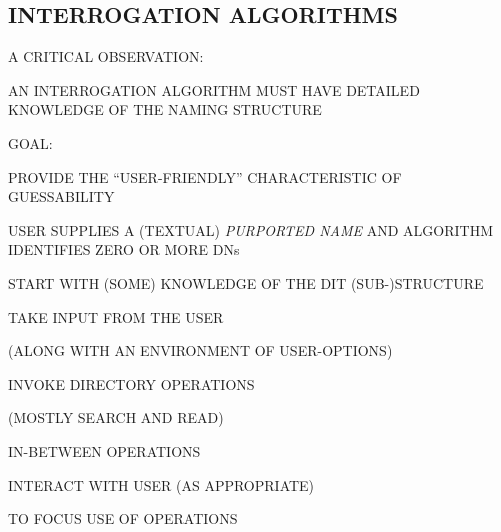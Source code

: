 \begin{bwslide}
\part*	{INTERROGATION ALGORITHMS}\bf

\begin{nrtc}
\item	A CRITICAL OBSERVATION:
    \begin{nrtc}
    \item	AN INTERROGATION ALGORITHM MUST HAVE DETAILED
		KNOWLEDGE OF THE NAMING STRUCTURE
    \end{nrtc}

\item	GOAL:
    \begin{nrtc}
    \item	PROVIDE THE ``USER-FRIENDLY'' CHARACTERISTIC OF
		GUESSABILITY

    \item	USER SUPPLIES A (TEXTUAL) \emph{PURPORTED NAME}
		AND ALGORITHM IDENTIFIES ZERO OR MORE DNs
    \end{nrtc}
\end{nrtc}
\end{bwslide}


\begin{bwslide}

\begin{nrtc}
\item	START WITH (SOME) KNOWLEDGE OF THE DIT (SUB-)STRUCTURE

\item	TAKE INPUT FROM THE USER
    \begin{nrtc}
    \item	(ALONG WITH AN ENVIRONMENT OF USER-OPTIONS)
    \end{nrtc}

\item	INVOKE DIRECTORY OPERATIONS
    \begin{nrtc}
    \item	(MOSTLY SEARCH AND READ)
    \end{nrtc}

\item	IN-BETWEEN OPERATIONS
    \begin{nrtc}
    \item	INTERACT WITH USER (AS APPROPRIATE)
    \end{nrtc}
    TO FOCUS USE OF OPERATIONS
\end{nrtc}
\end{bwslide}


